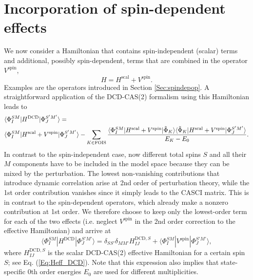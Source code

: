 \section{Incorporation of spin-dependent effects}
We now consider a Hamiltonian that contains spin-independent (scalar) terms and additional, possibly spin-dependent, terms that are combined in the operator $V^\text{spin}$,
	\begin{equation}
	H = {H^{{\text{scal}}}} + V^\text{spin}.
	\end{equation}
Examples are the operators introduced in Section \ref{Sec:spindepop}. A straightforward application of the DCD-CAS(2) formalism using this Hamiltonian leads to
	\begin{equation}
	\begin{gathered}
  \langle \Phi _I^{SM}|{H^{{\text{DCD}}}}|\Phi _J^{S'M'}\rangle  =  \hfill \\
  \langle \Phi _I^{SM}|{H^{{\text{scal}}}} + V^\text{spin}|\Phi _J^{S'M'}\rangle  - \sum\limits_{K \in {\text{FOIS}}} {\frac{{\langle \Phi _I^{SM}|{H^{{\text{scal}}}} + V^\text{spin}|{{\tilde \Phi }_K}\rangle \langle {{\tilde \Phi }_K}|{H^{{\text{scal}}}} + V^\text{spin}|\Phi _J^{S'M'}\rangle }}{{{E_K} - {E_0}}}}. 
\end{gathered} 
\end{equation}
In contrast to the spin-independent case, now different total spins $S$ and all their $M$ components have to be included in the model space because they can be mixed by the perturbation. 
The lowest non-vanishing contributions that introduce dynamic correlation arise at 2nd order of perturbation theory, while the 1st order contribution vanishes since it simply leads to the CASCI matrix.
This is in contrast to the spin-dependent operators, which already make a nonzero contribution at 1st order. We therefore choose to keep only the lowest-order term for each of the two effects (i.e. neglect $V^\text{spin}$ in the 2nd order correction to the effective Hamiltonian) and arrive at
	\begin{equation}
	\label{Eq:SOCDCD_uncorrected}
	\langle \Phi _I^{SM}|{H^{{\text{DCD}}}}|\Phi _J^{S'M'}\rangle  = {\delta _{SS'}}{\delta _{MM'}}H_{IJ}^{{\text{DCD}},S} + \langle \Phi _I^{SM}|V^\text{spin}|\Phi _J^{S'M'}\rangle, 
	\end{equation}
where $H^{\text{DCD},S}_{IJ}$ is the scalar DCD-CAS(2) effective Hamiltonian for a certain spin $S$; see Eq. (\ref{Eq:Heff_DCD}). Note that this expression also implies that state-specific 0th order energies $E_0$ are used for different multiplicities.
